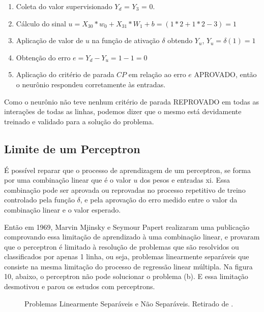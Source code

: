 \documentclass[	12pt, Times, openright, twoside, a4paper, english, brazil]{abntex2}
\begin{document}
            	\begin{enumerate}
            	    \item Coleta do valor supervisionado $Y_d$ = $Y_3$ = 0.
            		\item Cálculo do sinal $u = X_{30}*w_0 + X_{31}*W_1 +b  = (1*2 + 1*2 -3) = 1$
            		\item Aplicação de valor de $u$ na função de ativação $\delta$ obtendo $Y_u$, $Y_u = \delta(1) = 1$
            		\item Obtenção do erro $e = Y_d-Y_u = 1 - 1 = 0$
            		\item Aplicação do critério de parada $CP$ em relação ao erro $e$ APROVADO, então o neurônio respondeu corretamente às entradas.
            	\end{enumerate}
           
           		Como o neurônio não teve nenhum critério de parada REPROVADO em todas as interações de todas as linhas, podemos dizer que o mesmo está devidamente treinado e validado para a solução do problema.
            
        \subsection{Limite de um Perceptron}
          É possível reparar que o processo de aprendizagem de um perceptron, se forma por uma combinação linear que é o valor $ u $ dos pesos e entradas xi. Essa combinação pode ser aprovada ou reprovadas no processo repetitivo de treino controlado pela função $\delta$, e pela aprovação do erro medido entre o valor da combinação linear e o valor esperado.
          
          Então em 1969, Marvin Mjinsky e Seymour Papert realizaram uma publicação comprovando essa limitação de aprendizado à uma combinação linear, e provaram que o perceptron é limitado à resolução de problemas que são resolvidos ou classificados por apenas 1 linha, ou seja, problemas linearmente separáveis que consiste na mesma limitação do processo de regressão linear múltipla.
          Na figura 10, abaixo, o perceptron não pode solucionar o problema (b). E essa limitação desmotivou e parou os estudos com perceptrons.
    		  \begin{figure}[!ht]
    		  	\caption{Problemas Linearmente Separáveis e Não Separáveis. Retirado de \cite{Flavia2014}.\label{fig:problemasLineares}}
    		  \end{figure}
	  	
\end{document}
